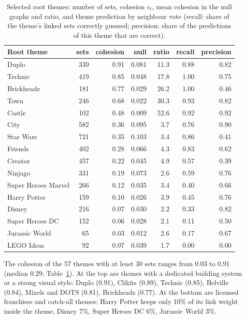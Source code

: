 \documentclass[10pt,a4paper]{article}
\begin{document}
\begin{table}[htbp]
  \centering
  \small
  \caption{Selected root themes: number of sets, cohesion $c_t$, mean
  cohesion in the null graphs and ratio, and theme prediction by neighbour
  vote (recall: share of the theme's linked sets correctly guessed; precision:
  share of the predictions of this theme that are correct).}
  \label{tab:themes}
  \begin{tabular}{lrrrrrr}
    \toprule
    Root theme & sets & cohesion & null & ratio & recall & precision \\
    \midrule
    Duplo & 339 & 0.91 & 0.081 & 11.3 & 0.88 & 0.82 \\
    Technic & 419 & 0.85 & 0.048 & 17.8 & 1.00 & 0.75 \\
    Brickheadz & 181 & 0.77 & 0.029 & 26.2 & 1.00 & 0.46 \\
    Town & 246 & 0.68 & 0.022 & 30.3 & 0.93 & 0.82 \\
    Castle & 102 & 0.48 & 0.009 & 52.6 & 0.92 & 0.92 \\
    City & 582 & 0.36 & 0.095 & 3.7 & 0.76 & 0.90 \\
    Star Wars & 721 & 0.35 & 0.103 & 3.4 & 0.86 & 0.41 \\
    Friends & 402 & 0.28 & 0.066 & 4.3 & 0.83 & 0.62 \\
    Creator & 457 & 0.22 & 0.045 & 4.9 & 0.57 & 0.39 \\
    Ninjago & 331 & 0.19 & 0.073 & 2.6 & 0.59 & 0.76 \\
    Super Heroes Marvel & 266 & 0.12 & 0.035 & 3.4 & 0.40 & 0.66 \\
    Harry Potter & 159 & 0.10 & 0.026 & 3.9 & 0.45 & 0.76 \\
    Disney & 216 & 0.07 & 0.030 & 2.2 & 0.33 & 0.82 \\
    Super Heroes DC & 152 & 0.06 & 0.028 & 2.1 & 0.11 & 0.50 \\
    Jurassic World & 65 & 0.03 & 0.012 & 2.6 & 0.17 & 0.67 \\
    LEGO Ideas & 92 & 0.07 & 0.039 & 1.7 & 0.00 & 0.00 \\
    \bottomrule
  \end{tabular}
\end{table}

The cohesion of the 57 themes with at least 30 sets ranges from 0.03 to 0.91
(median 0.29; Table~\ref{tab:themes}). At the top are themes with a dedicated
building system or a strong visual style: Duplo (0.91), Clikits (0.89),
Technic (0.85), Belville (0.84), Mixels and DOTS (0.81), Brickheadz (0.77).
At the bottom are licensed franchises and catch-all themes: Harry Potter
keeps only 10\% of its link weight inside the theme, Disney 7\%, Super Heroes
DC 6\%, Jurassic World 3\%.
\end{document}
